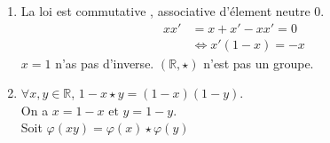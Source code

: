 	\begin{enumerate}
		\item La loi est commutative , associative d'élement neutre 0.
		\begin{align*}
			xx'& = x+x'-xx'= 0\\
			   & \Leftrightarrow x'(1-x)=-x
		\end{align*}
		$x=1$ n'as pas d'inverse. $(\mathbb{R},\star)$ n'est pas un groupe.
		\item $\forall x,y \in \mathbb{R}$, $1-x \star y = (1-x)(1-y)$.
		\\On a $x=1-x \text{ et } y=1-y$.
		\\Soit $\varphi(xy)=\varphi(x) \star \varphi(y)$
	\end{enumerate}
